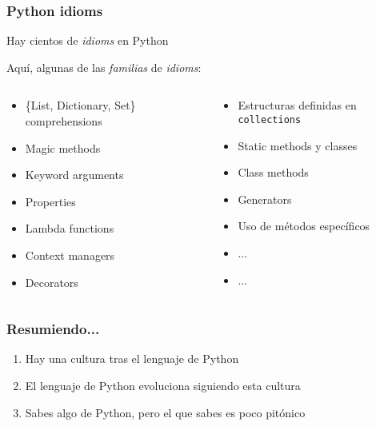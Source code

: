 \begin{frame}
\frametitle{Python idioms}

Hay cientos de \emph{idioms} en Python

Aquí, algunas de las \emph{familias} de \emph{idioms}:

  \begin{columns}[T]
    \begin{column}{.5\textwidth}
     \begin{block}{}

\begin{itemize}
  \item \{List, Dictionary, Set\} comprehensions
  \item Magic methods
  \item Keyword arguments
  \item Properties
  \item Lambda functions
  \item Context managers
  \item Decorators
\end{itemize}

    \end{block}
    \end{column}
    \begin{column}{.5\textwidth}
    \begin{block}{}


\begin{itemize}
  \item Estructuras definidas en \texttt{collections}
  \item Static methods y classes
  \item Class methods
  \item Generators
  \item Uso de métodos específicos
  \item ...    
  \item ...
\end{itemize}

    \end{block}
    \end{column}
  \end{columns}

\end{frame}


\begin{frame}
\frametitle{Resumiendo...}

\begin{enumerate}
  \item Hay una cultura tras el lenguaje de Python
  \item El lenguaje de Python evoluciona siguiendo esta cultura
  \item Sabes algo de Python, pero el que sabes es poco pitónico
\end{enumerate}

\end{frame}


